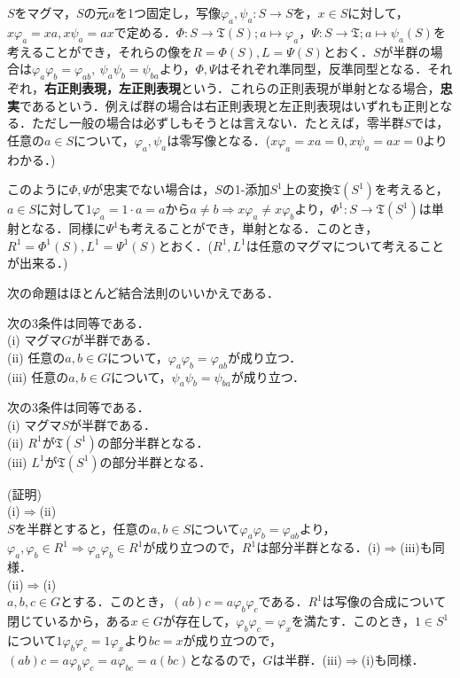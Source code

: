 $S$をマグマ，$S$の元$a$を1つ固定し，写像$\varphi_a, \psi_a:S\rightarrow S$を，$x\in S$に対して，$x\varphi_a=xa,x\psi_a=ax$で定める．$\Phi:S\rightarrow{\mathfrak T}(S);a\mapsto \varphi_a$，$\Psi:S\rightarrow{\mathfrak T};a\mapsto \psi_a(S)$を考えることができ，それらの像を$R=\Phi(S), L=\Psi(S)$とおく．$S$が半群の場合は$\varphi_a\varphi_b=\varphi_{ab},\:\psi_a\psi_b=\psi_{ba}$より，$\Phi,\Psi$はそれぞれ準同型，反準同型となる．それぞれ，{\bf 右正則表現，左正則表現}という．これらの正則表現が単射となる場合，{\bf 忠実}であるという．例えば群の場合は右正則表現と左正則表現はいずれも正則となる．ただし一般の場合は必ずしもそうとは言えない．たとえば，零半群$S$では，任意の$a\in S$について，$\varphi_a,\psi_a$は零写像となる．($x\varphi_a=xa=0, x\psi_a=ax=0$よりわかる．)\par
このように$\Phi,\Psi$が忠実でない場合は，$S$の1-添加$S^1$上の変換${\mathfrak T}(S^1)$を考えると，$a\in S$に対して$1\varphi_a=1\cdot a=a$から$a\neq b\Rightarrow x\varphi_a\neq x\varphi_b$より，$\Phi^1:S\rightarrow{\mathfrak T}(S^1)$は単射となる．同様に$\Psi^1$も考えることができ，単射となる．このとき，$R^1=\Phi^1(S), L^1=\Psi^1(S)$とおく．($R^1,L^1$は任意のマグマについて考えることが出来る．)\par
次の命題はほとんど結合法則のいいかえである．
\begin{sprop}
次の3条件は同等である．\\
(i) マグマ$G$が半群である．\\
(ii) 任意の$a,b\in G$について，$\varphi_a\varphi_b=\varphi_{ab}$が成り立つ．\\
(iii) 任意の$a,b\in G$について，$\psi_a\psi_b=\psi_{ba}$が成り立つ．
\end{sprop}
\begin{sprop}
次の3条件は同等である．\\
(i) マグマ$S$が半群である．\\
(ii) $R^1$が${\mathfrak T}(S^1)$の部分半群となる． \\
(iii) $L^1$が${\mathfrak T}(S^1)$の部分半群となる．
\end{sprop}
(証明) \\
(i)$\Rightarrow$(ii) \\
$S$を半群とすると，任意の$a,b\in S$について$\varphi_a\varphi_b=\varphi_{ab}$より，$\varphi_a,\varphi_b \in R^1\Rightarrow\varphi_a\varphi_b\in R^1$が成り立つので，$R^1$は部分半群となる．(i)$\Rightarrow$(iii)も同様．\\
(ii)$\Rightarrow$(i)　\\
$a,b,c\in G$とする．このとき，$(ab)c=a\varphi_b\varphi_c$である．$R^1$は写像の合成について閉じているから，ある$x\in G$が存在して，$\varphi_b\varphi_c=\varphi_x$を満たす．このとき，$1\in S^1$について$1\varphi_b\varphi_c=1\varphi_x$より$bc=x$が成り立つので，$(ab)c=a\varphi_b\varphi_c=a\varphi_{bc}=a(bc)$となるので，$G$は半群．(iii)$\Rightarrow$(i)も同様．
